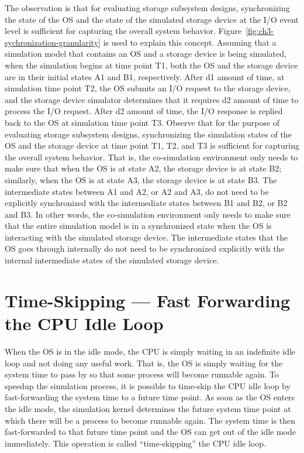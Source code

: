 The observation is that for evaluating storage subsystem designs, synchronizing the state of the OS and the state of the simulated storage device at the I/O event level is sufficient for capturing the overall system behavior. Figure~\ref{fig:ch3-sychronization-granularity} is used to explain this concept. Assuming that a simulation model that contains an OS and a storage device is being simulated, when the simulation begins at time point T1, both the OS and the storage device are in their initial states A1 and B1, respectively. After d1 amount of time, at simulation time point T2, the OS submits an I/O request to the storage device, and the storage device simulator determines that it requires d2 amount of time to process the I/O request. After d2 amount of time, the I/O response is replied back to the OS at simulation time point T3. Observe that for the purpose of evaluating storage subsystem designs, synchronizing the simulation states of the OS and the storage device at time point T1, T2, and T3 is sufficient for capturing the overall system behavior. That is, the co-simulation environment only needs to make sure that when the OS is at state A2, the storage device is at state B2; similarly, when the OS is at state A3, the storage device is at state B3. The intermediate states between A1 and A2, or A2 and A3, do not need to be explicitly synchronized with the intermediate states between B1 and B2, or B2 and B3. In other words, the co-simulation environment only needs to make sure that the entire simulation model is in a synchronized state when the OS is interacting with the simulated storage device. The intermediate states that the OS goes through internally do not need to be synchronized explicitly with the internal intermediate states of the simulated storage device.

\section{Time-Skipping --- Fast Forwarding the CPU Idle Loop}
\label{sec:time-skipping}

When the OS is in the idle mode, the CPU is simply waiting in an indefinite idle loop and not doing any useful work. That is, the OS is simply waiting for the system time to pass by so that some process will become runnable again. To speedup the simulation process, it is possible to time-skip the CPU idle loop by fast-forwarding the system time to a future time point. As soon as the OS enters the idle mode, the simulation kernel determines the future system time point at which there will be a process to become runnable again. The system time is then fast-forwarded to that future time point and the OS can get out of the idle mode immediately. This operation is called ``time-skipping'' the CPU idle loop.

